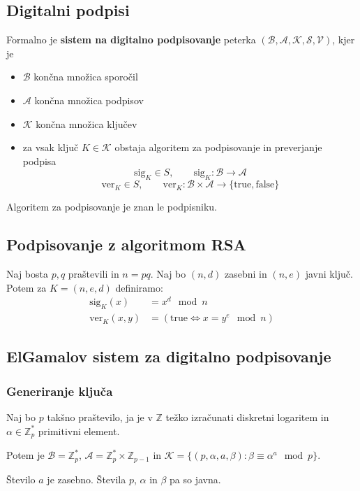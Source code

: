 \begin{multicols}{5}
\section*{Digitalni podpisi}
Formalno je \textbf{sistem na digitalno podpisovanje} peterka $(\mathcal{B}, \mathcal{A}, \mathcal{K}, \mathcal{S}, \mathcal{V})$, kjer je
\begin{itemize}
	\item $\mathcal{B}$ končna množica sporočil
	\item $\mathcal{A}$ končna množica podpisov
	\item $\mathcal{K}$ končna množica ključev
	\item za vsak ključ $K \in \mathcal{K}$ obstaja algoritem za podpisovanje in preverjanje podpisa
	\[ \text{sig}_K \in S, \qquad \text{sig}_K : \mathcal{B} \to \mathcal{A} \]
	\[ \text{ver}_K \in S, \qquad \text{ver}_K : \mathcal{B} \times \mathcal{A} \to \{\text{true}, \text{false}\} \]
\end{itemize}
Algoritem za podpisovanje je znan le podpisniku.

\subsection*{Podpisovanje z algoritmom RSA}
Naj bosta $p, q$ praštevili in $n = pq$. Naj bo $(n, d)$ zasebni in $(n, e)$ javni ključ.
Potem za $K = (n, e, d)$ definiramo:
\begin{align*}
\text{sig}_K(x) &= x^d \mod n \\
\text{ver}_K(x,y) &= \left( \text{true} \iff x = y^e \mod n \right)
\end{align*}

\subsection*{ElGamalov sistem za digitalno podpisovanje}
\subsubsection*{Generiranje ključa}
Naj bo $p$ takšno praštevilo, ja je v $\mathbb{Z}$ težko izračunati diskretni logaritem in $\alpha \in \mathbb{Z}_p^*$ primitivni element.

Potem je $\mathcal{B} = \mathbb{Z}_p^*$, $\mathcal{A} = \mathbb{Z}_p^* \times \mathbb{Z}_{p-1}$ in 
$\mathcal{K} = \{(p, \alpha, a, \beta) : \beta \equiv \alpha^a \mod p \}$.

Število $a$ je zasebno. Števila $p$, $\alpha$ in $\beta$ pa so javna.


\end{multicols}
